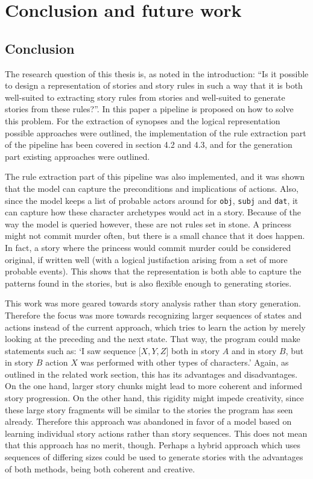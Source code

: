 \section{Conclusion and future work}

\subsection{Conclusion}

The research question of this thesis is, as noted in the introduction: ``Is it possible to design a
representation of stories and story rules in such a way that it is both 
well-suited to extracting story rules from stories and well-suited to generate 
stories from these rules?''.
In this paper a pipeline is proposed on how to solve this problem. For the
extraction of synopses and the logical representation possible approaches were
outlined, the implementation of the rule extraction part of the pipeline has
been covered in section 4.2 and 4.3, and for the generation part existing
approaches were outlined.

The rule extraction part of this pipeline was also implemented, and it was shown that the model can capture the preconditions and
implications of actions. Also, since the model keeps a list of probable actors
around for \texttt{obj}, \texttt{subj} and \texttt{dat},
it can capture how these character archetypes would act in a story. Because of the
way the model is queried however, these are not rules set in stone. A princess
might not commit murder often, but there is a small chance that it does happen. In
fact, a story where the princess would commit murder could be considered original, if
written well (with a logical justifaction arising from a set of more probable
events). This shows that the representation is both able to capture the patterns
found in the stories, but is also flexible enough to generating stories.

This work was more geared towards story analysis rather than story
generation. Therefore the focus was more towards recognizing larger sequences of
states and actions instead of the current approach, which tries to learn the
action by merely looking at the preceding and the next state. That way, the program could make statements
such as: `I saw sequence $ {[}X, Y, Z{]} $ both in story $A$ and in story $B$, but
in story $B$ action $X$ was performed with other types of characters.'
Again, as outlined in the related work
section, this has its advantages and disadvantages. On the one hand, larger story
chunks might lead to more coherent and informed story progression. On the other
hand, this rigidity might impede creativity, since these large story fragments
will be similar to the stories the program has seen already. Therefore this
approach was abandoned in favor of a model based on learning individual story
actions rather than story sequences. This does not mean that this approach has
no merit, though. Perhaps a hybrid approach which uses
sequences of differing sizes could be used to generate stories with the
advantages of both methods, being both coherent and creative.

